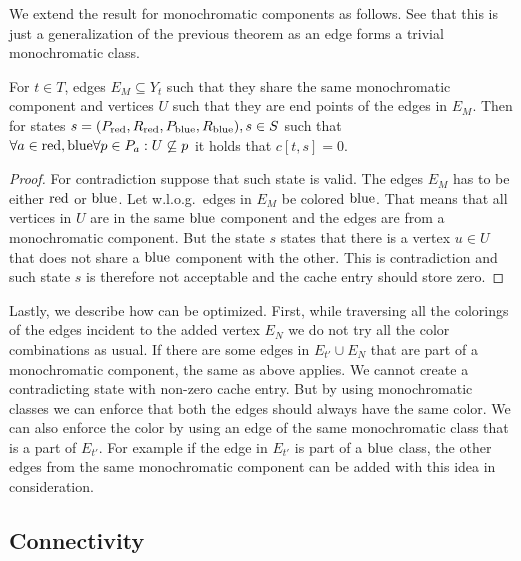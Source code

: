 We extend the result for monochromatic components as follows.
See that this is just a generalization of the previous theorem
as an edge forms a trivial monochromatic class.
%
\begin{theorem}
	For \( t \in T \),
	edges \( E_M \subseteq Y_t \) such that
	they share the same monochromatic component
	and vertices \( U \) such that they are end points of the edges in \( E_M \).
	Then for states \( s = (P_{\text{red}}, R_{\text{red}}, P_{\text{blue}}, R_{\text{blue}}), s \in S \) such that
	\( \forall a \in {\text{red}, \text{blue}} \forall p \in P_a : U \not\subseteq p \)
	it holds that \( c[t, s] = 0 \).
\end{theorem}
%
%
\begin{proof}
	For contradiction suppose that such state is valid. The edges \( E_M \)
	has to be either \( \text{red} \) or \( \text{blue} \).
	Let w.l.o.g.\ edges in \( E_M \) be colored \( \text{blue} \).
	That means that all vertices in \( U \) are in the same \( \text{blue} \) component
	and the edges are from a monochromatic component.
	But the state \( s \) states that there is a vertex \( u \in U \)
	that does not share a \( \text{blue} \) component with the other.
	This is contradiction and such state \( s \) is therefore not acceptable
	and the cache entry should store zero.
\end{proof}
%

Lastly, we describe how \IntroduceVertexWithEdgesNode{} can be optimized.
First, while traversing all the colorings of the edges incident to the added vertex \( E_N \)
we do not try all the color combinations as usual. If there are some edges
in \( E_{t'} \cup E_N \) that are part of a monochromatic component,
the same as above applies. We cannot create a contradicting state with non-zero
cache entry. But by using monochromatic classes
we can enforce that both the edges should always have the same color.
We can also enforce the color by using an edge of the same monochromatic class
that is a part of \( E_{t'} \).
For example if the edge in \( E_{t'} \) is part of a \( \text{blue} \) class,
the other edges from the same monochromatic component can be added with
this idea in consideration.



\subsection{Connectivity}

